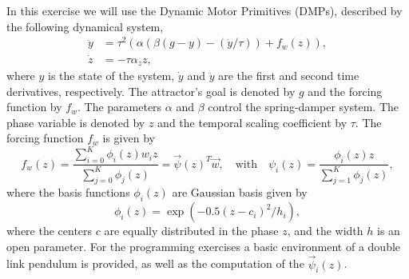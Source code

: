 \newif\ifvimbug
\vimbugfalse

\ifvimbug

\fi

In this exercise we will use the Dynamic Motor Primitives (DMPs), described by the following dynamical system,
%
\begin{align}
    \ddot{y}&=\tau^2(\alpha(\beta(g-y)-(\dot{y}/\tau))+f_w(z)), \label{eq:dmp} \\
    \dot{z}&=-\tau\alpha_zz, \label{eq:dmp_phase}
\end{align}
%
where $y$ is the state of the system, $\dot{y}$ and $\ddot{y}$ are the first and second time derivatives, respectively. The attractor's goal is denoted by $g$ and the forcing function by $f_w$. The parameters $\alpha$ and $\beta$ control the spring-damper system. The phase variable is denoted by $z$ and the temporal scaling coefficient by $\tau$. The forcing function $f_w$ is given by
%
\begin{equation}
    f_w(z)=\frac{\sum_{i=0}^{K}\phi_{i}(z)w_{i}z}{\sum_{j=0}^{K}\phi_{j}(z)}=\vec{\psi}(z)^{T}\vec{w},
    \quad \textrm{with}\quad \psi_i(z) = \frac{\phi_i(z)z}{\sum_{j=1}^K\phi_j(z)},
\end{equation}
%
where the basis functions $\phi_i(z)$ are Gaussian basis given by
%
\begin{equation}
    \phi_i(z) = \exp(-0.5(z-c_i)^2/h_i),
\end{equation}
where the centers $c$ are equally distributed in the phase $z$, and the width $h$ is an open parameter. For the programming exercises a basic environment of a double link pendulum is provided, as well as the computation of the $\vec{\psi}_i(z)$.


